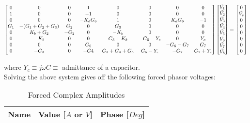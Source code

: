 \begin{equation} \nonumber
\label{eq:node}
\centering
\begin{bmatrix}
0 & 0 & 0 & 1 & 0 & 0 & 0 & 0 \\
1 & 0 & 0 & -1 & 0 & 0 & 0 & 0 \\
0 & 0 & 0 & -K_dG_6 & 1 & 0 & K_dG_6 & -1\\
G_1 & -(G_1+G_2+G_3) & G_2 & 0 & G_3 & 0 & 0 & 0  \\
0 & K_b+G_2 & -G_2 & 0 & -K_b & 0 & 0 & 0 \\
0 & -K_b & 0 & 0 & G_5+K_b & -G_5-Y_c & 0 & Y_c \\
0 & 0 & 0 & G_6 & 0 & 0 & -G_6-G_7 & G_7 \\
0 & -G_3 & 0 & -G4 & G_3+G_4+G_5 & G_5-Y_c & -G_7 & G_7+Y_c
\end{bmatrix}
\begin{bmatrix}
\Tilde{V_1} \\
\Tilde{V_2} \\
\Tilde{V_3} \\
\Tilde{V_4} \\
\Tilde{V_5} \\
\Tilde{V_6} \\
\Tilde{V_7} \\
\Tilde{V_8} \\
\end{bmatrix}
=
\begin{bmatrix}
0 \\
\Tilde{V_s} \\
0 \\
0 \\ 
0 \\
0 \\
0 \\
0
\end{bmatrix}
\end{equation}

where $Y_c\equiv j\omega C \equiv$ admittance of a capacitor.\\

Solving the above system gives off the following forced phasor voltages:

\begin{table}[h]
    \centering
    \begin{tabular}{|c|c|c|}
    \hline
    {\bf Name} & {\bf Value [$A$ or $V$]} & {\bf Phase [$Deg$]} \\ \hline
    
    \end{tabular}
    \caption{Forced Complex Amplitudes}
    \label{tab:ngspice1}
\end{table}

